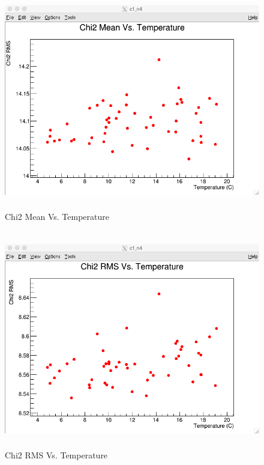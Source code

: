 \documentclass[./Thesis]{subfiles}
\begin{document}
\begin{figure}
	\centerline{\includegraphics[height=95mm]{Chi2MeanVsTemp.png}}
	\caption[Chi2 Mean Vs. Temperature]{Chi2 Mean Vs. Temperature}
	\label{fig:chiTemp}
\end{figure} 
	 
\begin{figure}
	\centerline{\includegraphics[height=95mm]{Chi2RMSVsTemp.png}}
	\caption[Chi2 RMS Vs. Temperature]{Chi2 RMS Vs. Temperature}
	\label{fig:chiRMS}
\end{figure} 	
	
\end{document}
